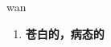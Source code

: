 
\begin{frame}
{\huge wan}
\begin{center}
\begin{enumerate}\Large
  \item \textbf{苍白的，病态的}
\end{enumerate}
\end{center}
\end{frame}
